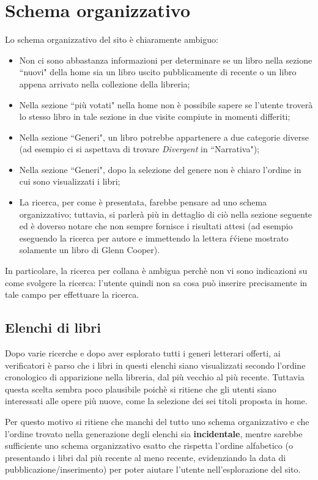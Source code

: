 \section{Schema organizzativo}\label{sec:schema-org}
Lo schema organizzativo del sito è chiaramente ambiguo:
\begin{itemize}
\item Non ci sono abbastanza informazioni per determinare se un libro nella
sezione ``nuovi" della home sia un libro uscito pubblicamente di recente o un
libro appena arrivato nella collezione della libreria;
\item Nella sezione ``più votati" nella home non è possibile sapere se
l'utente troverà lo stesso libro in tale sezione in due visite compiute in
momenti differiti;
\item Nella sezione ``Generi", un libro potrebbe appartenere a due categorie
diverse (ad esempio ci si aspettava di trovare \textit{Divergent} in
``Narrativa");
\item Nella sezione ``Generi", dopo la selezione del genere non è chiaro
l'ordine in cui sono visualizzati i libri;
\item La ricerca, per come è presentata, farebbe pensare ad uno schema
organizzativo; tuttavia, si parlerà più in dettaglio di ciò nella sezione
seguente ed è doverso notare che non sempre fornisce i risultati attesi (ad
esempio eseguendo la ricerca per autore e immettendo la lettera \'r\' viene
mostrato solamente un libro di Glenn Cooper).
\end{itemize}

In particolare, la ricerca per collana è ambigua perchè non vi sono
indicazioni su come svolgere la ricerca: l'utente quindi non sa cosa può
inserire precisamente in tale campo per effettuare la ricerca.

\subsection{Elenchi di libri}
Dopo varie ricerche e dopo aver esplorato tutti i generi letterari offerti, ai
verificatori è parso che i libri in questi elenchi siano visualizzati secondo
l'ordine cronologico di apparizione nella libreria, dal più vecchio al
più recente. Tuttavia questa scelta sembra poco plausibile poichè si ritiene
che gli utenti siano interessati alle opere più nuove, come la selezione dei
sei titoli proposta in home.

Per questo motivo si ritiene che manchi del tutto uno schema organizzativo e
che l'ordine trovato nella generazione degli elenchi sia \textbf{incidentale},
mentre sarebbe sufficiente uno schema organizzativo esatto che rispetta
l'ordine alfabetico (o presentando i libri dal più recente al meno recente,
evidenziando la data di pubblicazione/inserimento) per poter aiutare l'utente
nell'esplorazione del sito.